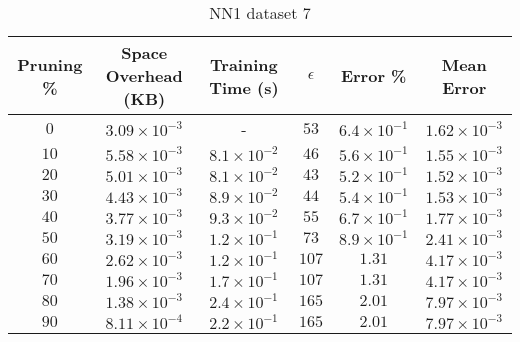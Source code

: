 \begin{adjustwidth}{0cm}{}
\begin{table}
\caption{NN1 dataset 7}\label{pr17}
\begin{tabular}{cccccc}
\hline
\toprule
Pruning \% & Space Overhead (KB) & Training Time (s) & $\epsilon$ & Error \% & Mean Error\\
\midrule
$0$ & $3.09 \times 10^{-3}$ & - & $53$ & $6.4 \times 10^{-1}$ & $1.62 \times 10^{-3}$\\
$10$ & $5.58 \times 10^{-3}$ & $8.1 \times 10^{-2}$ & $46$ & $5.6 \times 10^{-1}$ & $1.55 \times 10^{-3}$\\
$20$ & $5.01 \times 10^{-3}$ & $8.1 \times 10^{-2}$ & $43$ & $5.2 \times 10^{-1}$ & $1.52 \times 10^{-3}$\\
$30$ & $4.43 \times 10^{-3}$ & $8.9 \times 10^{-2}$ & $44$ & $5.4 \times 10^{-1}$ & $1.53 \times 10^{-3}$\\
$40$ & $3.77 \times 10^{-3}$ & $9.3 \times 10^{-2}$ & $55$ & $6.7 \times 10^{-1}$ & $1.77 \times 10^{-3}$\\
$50$ & $3.19 \times 10^{-3}$ & $1.2 \times 10^{-1}$ & $73$ & $8.9 \times 10^{-1}$ & $2.41 \times 10^{-3}$\\
$60$ & $2.62 \times 10^{-3}$ & $1.2 \times 10^{-1}$ & $107$ & $1.31$ & $4.17 \times 10^{-3}$\\
$70$ & $1.96 \times 10^{-3}$ & $1.7 \times 10^{-1}$ & $107$ & $1.31$ & $4.17 \times 10^{-3}$\\
$80$ & $1.38 \times 10^{-3}$ & $2.4 \times 10^{-1}$ & $165$ & $2.01$ & $7.97 \times 10^{-3}$\\
$90$ & $8.11 \times 10^{-4}$ & $2.2 \times 10^{-1}$ & $165$ & $2.01$ & $7.97 \times 10^{-3}$\\
\bottomrule
\end{tabular}
\end{table}
\end{adjustwidth}


